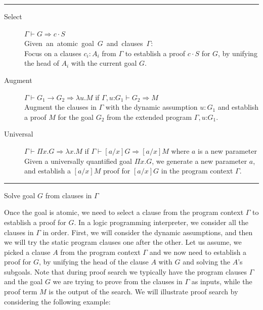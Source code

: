 \documentclass{acmconf}
\newcommand{\figfoot}{\vspace{1ex}\hrule}
\newcommand{\fighead}{\hrule\vspace{1.5ex}}
\newcommand{\vd}{\vdash}
\newcommand{\arrow}{\rightarrow}
\newcommand{\oftp}{\mathord{:}}
\begin{document}
\begin{table}[h]
\fighead
\begin{center}
\begin{small}
\begin{description}
\item[Select] $\Gamma \vd  G \Rightarrow c\cdot S$ \\
    \mbox{Given an atomic goal $G$ and clauses $\Gamma$:}\hfill\\
     Focus on a clauses $c_i : A_i$ from $\Gamma$ to establish a proof
     $c\cdot S$ for $G$, by unifying the head of $A_i$ with the current
     goal $G$. 

\item[Augment] $\Gamma \vd  G_1 \arrow G_2 \Rightarrow \lambda u. M$ if $\Gamma,
  u\oftp G_1 \vd G_2 \Rightarrow M$ \\
Augment the clauses in $\Gamma$ with the dynamic assumption $u : G_1$ and
establish a proof $M$ for the goal $G_2$ from the extended program
$\Gamma, u \oftp G_1$. 
\item[Universal] $\Gamma \vd  \Pi x. G \Rightarrow \lambda x. M$ if $\Gamma \vd
  [a/x]G\Rightarrow [a/x]M$ where $a$ is a new parameter\\
Given a universally quantified goal $\Pi x. G$, we generate a new parameter $a$, and establish a $[a/x]M$ proof  for $[a/x]G$ in the program context $\Gamma$.
\end{description}
\end{small}    
\end{center}
\figfoot
\caption{\label{fig:solve}Solve goal $G$ from clauses in $\Gamma$}
\end{table}

Once the goal is atomic, we need to select a clause from the
program context $\Gamma$ to establish a proof for $G$. In a logic
programming interpreter, we consider all the clauses in $\Gamma$ in order. 
First, we will consider the dynamic assumptions, and then we will try
the static program clauses one after the other. 
Let us assume, we picked a clause $A$ from the program context
$\Gamma$ and we now need to establish a proof for $G$, by unifying the
head of the clause $A$ with $G$ and solving the $A$'s subgoals.
Note that during proof search we typically have the program
clauses $\Gamma$ and the goal $G$ we are trying to prove from the
clauses in $\Gamma$ as inputs, while the proof term $M$ is the output
of the search. We will illustrate proof search by considering the
following example:  
\end{document}
